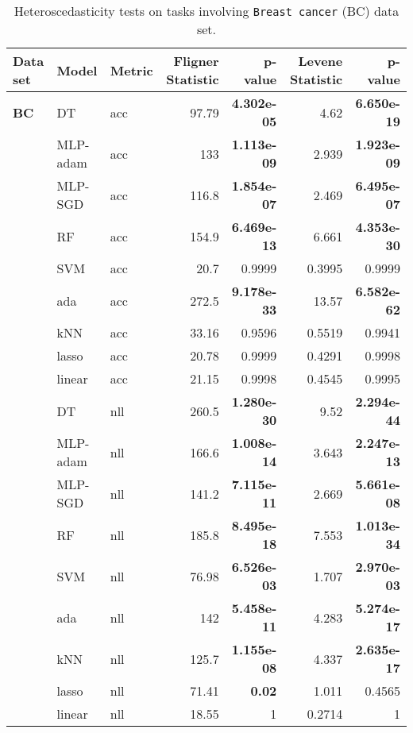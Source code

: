 \documentclass[jair,twoside,11pt,theapa]{article}
\theoremstyle{definition}
\begin{document}
\begin{table*}
\centering
\caption{Heteroscedasticity tests on tasks involving \texttt{Breast cancer} (BC) data set.}
\label{tab:search-spacehetero-tests-Breast cancer dataset}
\begin{tabular}{lllrrrr}
\toprule
Data set & Model & Metric & Fligner Statistic & p-value &  Levene Statistic & p-value \\ 
\midrule
\textbf{BC} & DT & acc & 97.79 & \textbf{4.302e-05} & 4.62 & \textbf{6.650e-19} \\ 
  & MLP-adam & acc & 133 & \textbf{1.113e-09} & 2.939 & \textbf{1.923e-09} \\ 
  & MLP-SGD & acc & 116.8 & \textbf{1.854e-07} & 2.469 & \textbf{6.495e-07} \\ 
  & RF & acc & 154.9 & \textbf{6.469e-13} & 6.661 & \textbf{4.353e-30} \\ 
  & SVM & acc & 20.7 & 0.9999 & 0.3995 & 0.9999 \\ 
  & ada & acc & 272.5 & \textbf{9.178e-33} & 13.57 & \textbf{6.582e-62} \\ 
  & kNN & acc & 33.16 & 0.9596 & 0.5519 & 0.9941 \\ 
  & lasso & acc & 20.78 & 0.9999 & 0.4291 & 0.9998 \\ 
  & linear & acc & 21.15 & 0.9998 & 0.4545 & 0.9995 \\ 
  & DT & nll & 260.5 & \textbf{1.280e-30} & 9.52 & \textbf{2.294e-44} \\ 
  & MLP-adam & nll & 166.6 & \textbf{1.008e-14} & 3.643 & \textbf{2.247e-13} \\ 
  & MLP-SGD & nll & 141.2 & \textbf{7.115e-11} & 2.669 & \textbf{5.661e-08} \\ 
  & RF & nll & 185.8 & \textbf{8.495e-18} & 7.553 & \textbf{1.013e-34} \\ 
  & SVM & nll & 76.98 & \textbf{6.526e-03} & 1.707 & \textbf{2.970e-03} \\ 
  & ada & nll & 142 & \textbf{5.458e-11} & 4.283 & \textbf{5.274e-17} \\ 
  & kNN & nll & 125.7 & \textbf{1.155e-08} & 4.337 & \textbf{2.635e-17} \\ 
  & lasso & nll & 71.41 & \textbf{0.02} & 1.011 & 0.4565 \\ 
  & linear & nll & 18.55 & 1 & 0.2714 & 1 \\ 
\bottomrule
\end{tabular}
\end{table*}
\end{document}
